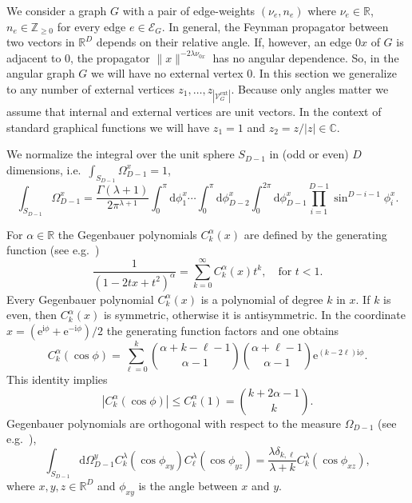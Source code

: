 \documentclass[oneside]{amsart}
\newcommand{\CC}{{\mathbb C}}
\newcommand{\RR}{{\mathbb R}}
\newcommand{\ZZ}{{\mathbb Z}}
\newcommand{\ee}{\mathrm{e}}
\newcommand{\ii}{\mathrm{i}}
\newcommand{\dd}{\mathrm{d}}
\newcommand{\sE}{\mathcal{E}}
\newcommand{\sV}{\mathcal{V}}
\newcommand{\sVGext}{{\sV_G^\mathrm{ext}}}
\newcommand{\VGext}{{|\sVGext|}}
\theoremstyle{plain}
\begin{document}
We consider a graph $G$ with a pair of edge-weights $(\nu_e,n_e)$ where $\nu_e\in\RR$, $n_e\in\ZZ_{\geq0}$ for every edge $e\in\sE_G$.
In general, the Feynman propagator between two vectors in $\RR^D$ depends on their relative angle.
If, however, an edge $0x$ of $G$ is adjacent to 0, the propagator $\|x\|^{-2\lambda\nu_{0x}}$ has no angular dependence. So, in the angular graph $G$ we will have no external vertex 0.
In this section we generalize to any number of external vertices $z_1,\ldots,z_\VGext$.
Because only angles matter we assume that internal and external vertices are unit vectors. In the context of standard graphical functions we will have $z_1=1$ and $z_2=z/|z|\in\CC$.

We normalize the integral over the unit sphere $S_{D-1}$ in (odd or even) $D$ dimensions, i.e.\ $\int_{S_{D-1}}\Omega_{D-1}^x=1$,
\begin{equation}\label{SD1}
\int_{S_{D-1}}\Omega_{D-1}^x=\frac{\Gamma(\lambda+1)}{2\pi^{\lambda+1}}\int_0^\pi\dd\phi^x_1\cdots\int_0^\pi\dd\phi^x_{D-2}\int_0^{2\pi}\dd\phi^x_{D-1}\prod_{i=1}^{D-1}\sin^{D-i-1}\phi^x_i.
\end{equation}

For $\alpha\in\RR$ the Gegenbauer polynomials $C^\alpha_k(x)$ are defined by the generating function (see e.g.\ \cite[Chapter~22]{AS})
\begin{equation}\label{Cdef}
\frac{1}{(1-2tx+t^2)^\alpha}=\sum_{k=0}^\infty C^\alpha_k(x)t^k,\quad\text{for }t<1.
\end{equation}
Every Gegenbauer polynomial $C^\alpha_k(x)$ is a polynomial of degree $k$ in $x$. If $k$ is even, then $C^\alpha_k(x)$ is symmetric, otherwise it is antisymmetric.
In the coordinate $x=(\ee^{\ii\phi}+\ee^{-\ii\phi})/2$ the generating function factors and one obtains
\begin{equation}\label{Cdef1}
C^\alpha_k(\cos\phi)=\sum_{\ell=0}^k\genfrac(){0pt}{}{\alpha+k-\ell-1}{\alpha-1}\genfrac(){0pt}{}{\alpha+\ell-1}{\alpha-1}\ee^{(k-2\ell)\ii\phi}.
\end{equation}
This identity implies
\begin{equation}\label{C1}
|C^\alpha_k(\cos\phi)|\leq C^\alpha_k(1)=\genfrac(){0pt}{}{k+2\alpha-1}{k}.
\end{equation}
Gegenbauer polynomials are orthogonal with respect to the measure $\Omega_{D-1}$ (see e.g.\ \cite{DStanton}),
\begin{equation}\label{Gegorth}
\int_{S_{D-1}}\dd\Omega^y_{D-1}C^\lambda_k(\cos\phi_{xy})C^\lambda_\ell(\cos\phi_{yz})=\frac{\lambda\delta_{k,\ell}}{\lambda+k}C^\lambda_k(\cos\phi_{xz}),
\end{equation}
where $x,y,z\in\RR^D$ and $\phi_{xy}$ is the angle between $x$ and $y$.
\end{document}
